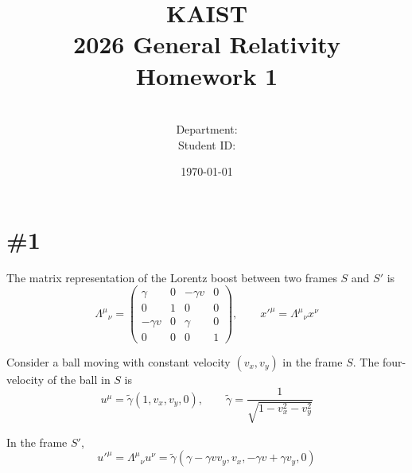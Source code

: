 \documentclass[a4paper,11pt]{article}
\title{KAIST\\2026 General Relativity\\
Homework 1\bigskip}
\author{\textbf{\Large \name} \\
Department: \department\\
Student ID: \studentid}
\date{\today}
\begin{document}
\thispagestyle{empty}
\maketitle
\tableofcontents
{}
\setcounter{secnumdepth}{1}
\setcounter{tocdepth}{2}

\newcommand{\tr}{\operatorname{tr}}
\newcommand{\sgn}{\operatorname{sgn}}
\newcommand{\supp}{\operatorname{supp}}
\renewcommand{\Re}{\operatorname{Re}}
\renewcommand{\Im}{\operatorname{Im}}
\newcommand{\boltz}{k_{\mathrm{B}}}

\section{\#1}

The matrix representation of the Lorentz boost between two frames $S$ and $S'$ is
\begin{equation}
    \Lambda^\mu{}_\nu = \begin{pmatrix}
        \gamma & 0 & -\gamma v & 0 \\
        0 & 1 & 0 & 0 \\
        -\gamma v & 0 & \gamma & 0 \\
        0 & 0 & 0 & 1
    \end{pmatrix}, \qquad x'^\mu = \Lambda^\mu{}_\nu x^\nu
\end{equation}

Consider a ball moving with constant velocity $(v_x, v_y)$ in the frame $S$. The four-velocity of the ball in $S$ is
\begin{equation}
    u^\mu = \tilde{\gamma}(1, v_x, v_y, 0), \qquad \tilde{\gamma} = \frac{1}{\sqrt{1 - v_x^2 - v_y^2}}
\end{equation}

In the frame $S'$,
\begin{equation}
    u'^\mu = \Lambda^\mu{}_\nu u^\nu = \tilde{\gamma}(\gamma - \gamma vv_y, v_x, -\gamma v + \gamma v_y, 0)
\end{equation}
\end{document}
